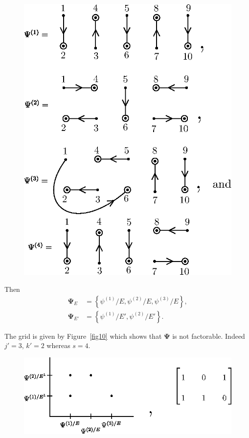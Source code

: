 \documentclass[a4paper,12pt]{article}
\theoremstyle{definition}
\theoremstyle{underlinethm}
\theoremstyle{definition}
\begin{document}
\begin{figure}[h]
\centering
\includegraphics[scale=1.1]{figure/figures/fig9.eps}
\caption{}\label{fig09}
\end{figure}

Then 
\begin{align*}
\boldsymbol{\Psi}_{E} &= \left\{\psi^{(1)}/E , \psi^{(2)}/E, \psi^{(3)}/E\right\},\\
\boldsymbol{\Psi}_{E'} & = \left\{\psi^{(1)}/E' , \psi^{(2)}/E'\right\}.
\end{align*}



The grid is given by Figure~\eqref{fig10} which shows that $\boldsymbol{\Psi}$ is not factorable. Indeed $j' =3$, $k'=2$ whereas $s = 4$.

\newpage

\begin{figure}[h]
\centering
\includegraphics[scale=1.1]{figure/figures/fig10.eps}
\caption{}\label{fig10}
\end{figure}
\end{document}
